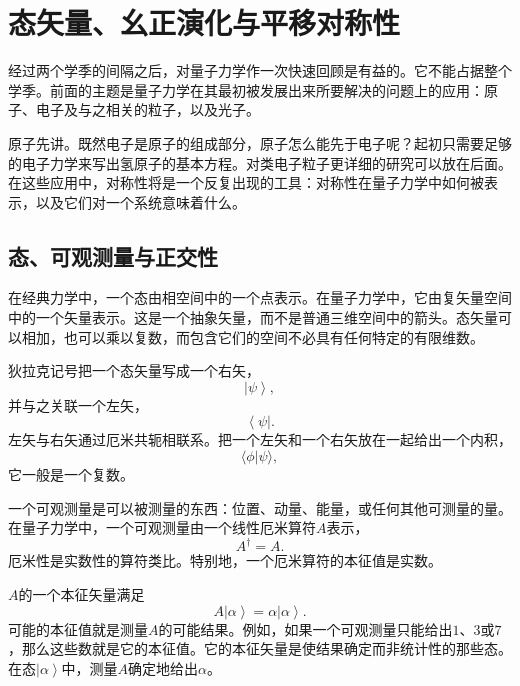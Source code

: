 \chapter{态矢量、幺正演化与平移对称性}
\providecommand{\ket}[1]{\left\lvert#1\right\rangle}
\providecommand{\bra}[1]{\left\langle#1\right\rvert}

经过两个学季的间隔之后，对量子力学作一次快速回顾是有益的。它不能占据整个学季。前面的主题是量子力学在其最初被发展出来所要解决的问题上的应用：原子、电子及与之相关的粒子，以及光子。

原子先讲。既然电子是原子的组成部分，原子怎么能先于电子呢？起初只需要足够的电子力学来写出氢原子的基本方程。对类电子粒子更详细的研究可以放在后面。在这些应用中，对称性将是一个反复出现的工具：对称性在量子力学中如何被表示，以及它们对一个系统意味着什么。

\section{态、可观测量与正交性}

在经典力学中，一个态由相空间中的一个点表示。在量子力学中，它由复矢量空间中的一个矢量表示。这是一个抽象矢量，而不是普通三维空间中的箭头。态矢量可以相加，也可以乘以复数，而包含它们的空间不必具有任何特定的有限维数。

狄拉克记号把一个态矢量写成一个右矢，
\begin{equation}
\ket{\psi},
\end{equation}
并与之关联一个左矢，
\begin{equation}
\bra{\psi}.
\end{equation}
左矢与右矢通过厄米共轭相联系。把一个左矢和一个右矢放在一起给出一个内积，
\begin{equation}
\langle\phi|\psi\rangle,
\end{equation}
它一般是一个复数。

一个可观测量是可以被测量的东西：位置、动量、能量，或任何其他可测量的量。在量子力学中，一个可观测量由一个线性厄米算符\(A\)表示，
\begin{equation}
A^\dagger=A.
\end{equation}
厄米性是实数性的算符类比。特别地，一个厄米算符的本征值是实数。

\(A\)的一个本征矢量满足
\begin{equation}
A\ket{\alpha}=\alpha\ket{\alpha}.
\end{equation}
可能的本征值就是测量\(A\)的可能结果。例如，如果一个可观测量只能给出\(1\)、\(3\)或\(7\)，那么这些数就是它的本征值。它的本征矢量是使结果确定而非统计性的那些态。在态\(\ket{\alpha}\)中，测量\(A\)确定地给出\(\alpha\)。

